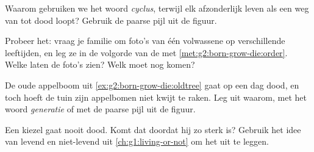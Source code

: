 \begin{exercise}[$\star$]\label{exo:g2:born-grow-die:7}
Waarom gebruiken we het woord \emph{cyclus}, terwijl elk afzonderlijk
leven als een weg van  tot dood loopt? Gebruik de paarse pijl
uit de figuur.
\end{exercise}

\begin{exercise}[$\star$]\label{exo:g2:born-grow-die:8}
Probeer het: vraag je familie om foto's van één volwassene op
verschillende leeftijden, en leg ze in de volgorde van de 
met \cref{met:g2:born-grow-die:order}. Welke  laten de foto's
zien? Welk  moet nog komen?
\end{exercise}

\begin{exercise}[$\star\star$]\label{exo:g2:born-grow-die:9}
De oude appelboom uit \cref{ex:g2:born-grow-die:oldtree} gaat op een
dag dood, en toch hoeft de tuin zijn appelbomen niet kwijt te raken.
Leg uit waarom, met het woord \emph{generatie} of met de paarse pijl
uit de figuur.
\end{exercise}

\begin{exercise}[$\star\star$]\label{exo:g2:born-grow-die:10}
Een kiezel gaat nooit dood. Komt dat doordat hij zo sterk is? Gebruik
het idee van levend en niet-levend uit \cref{ch:g1:living-or-not} om
het uit te leggen.
\end{exercise}

